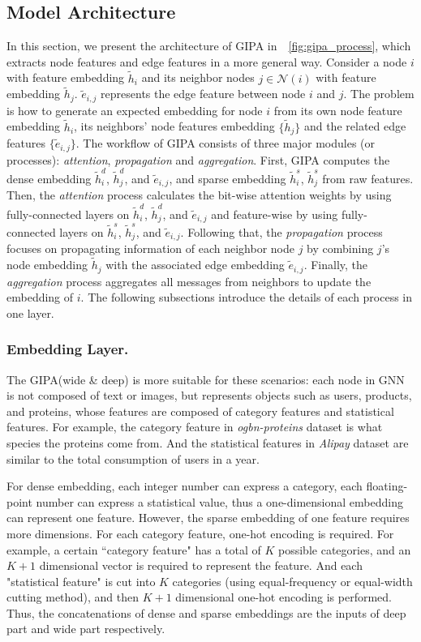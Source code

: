 \documentclass[runningheads]{llncs}
\newcommand{\model}{GIPA\xspace}
\begin{document}
\subsection{Model Architecture}
In this section, we present the architecture of \model in~\figurename~\ref{fig:gipa_process}, which  extracts node features and edge features in a more general way. Consider a node $i$ with feature embedding $\tilde{h}_i$ and its neighbor nodes $j\in\mathcal{N}(i)$ with feature embedding $\tilde{h}_j$. $\tilde{e}_{i, j}$ represents the edge feature between node $i$ and $j$. The problem is how to generate an expected embedding for node $i$ from its own node feature embedding $\tilde{h}_i$, its neighbors' node features embedding $\{\tilde{h}_j\}$ and the related edge features $\{\tilde{e}_{i, j}\}$. 
The workflow of \model consists of three major modules (or processes): \textit{attention}, \textit{propagation} and \textit{aggregation}. 
First, \model computes the dense embedding $\tilde{h}_i^d$, $\tilde{h}_j^d$, and $\tilde{e}_{i, j}$, and sparse embedding $\tilde{h}_i^s$, $\tilde{h}_j^s$ from raw features.
Then, the \textit{attention} process calculates the bit-wise attention weights by using fully-connected layers on $\tilde{h}_i^d$, $\tilde{h}_j^d$, and $\tilde{e}_{i, j}$ and feature-wise by using fully-connected layers on $\tilde{h}_i^s$, $\tilde{h}_j^s$, and $\tilde{e}_{i, j}$. 
Following that, the \textit{propagation} process focuses on propagating information of each neighbor node $j$ by combining $j$'s node embedding $\tilde{h}_j$ with the associated edge embedding $\tilde{e}_{i, j}$. 
Finally, the \textit{aggregation} process aggregates all messages from neighbors to update the embedding of $i$. The following subsections introduce the details of each process in one layer.

\subsubsection{Embedding Layer.}
The \model (wide \& deep) is more suitable for these scenarios: each node in GNN is not composed of text or images, but represents objects such as users, products, and proteins, whose features are composed of category features and statistical features. 
For example, the category feature in \textit{ogbn-proteins} dataset is what species the proteins come from. 
And the statistical features in \textit{Alipay} dataset are similar to the total consumption of users in a year.

For dense embedding, each integer number can express a category, each floating-point number can express a statistical value, thus a one-dimensional embedding can represent one feature.
However, the sparse embedding of one feature requires more dimensions.
For each category feature, one-hot encoding is required. 
For example, a certain ``category feature" has a total of $K$ possible categories, and an $K+1$ dimensional vector is required to represent the feature.
And each "statistical feature" is cut into $K$ categories (using equal-frequency or equal-width cutting method), and then $K+1$ dimensional one-hot encoding is performed.
Thus, the concatenations of dense and sparse embeddings are the inputs of deep part and wide part respectively.
\end{document}
